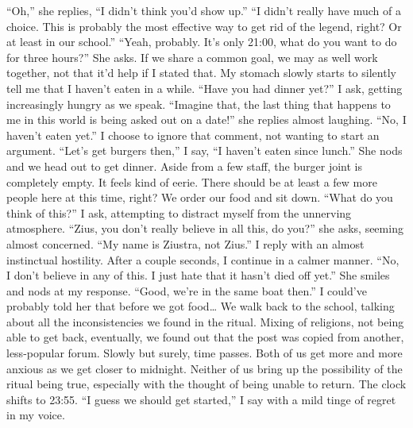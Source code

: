 \documentclass[a4paper, 12pt]{book}
\newcommand\tab[1][1cm]{\hspace*{#1}}
\begin{document}
\newline
\tab
“Oh,” she replies, “I didn’t think you’d show up.”
\newline
\tab
“I didn’t really have much of a choice. This is probably the most effective way to get rid of the legend, right? Or at least in our school.”
\newline
\tab
“Yeah, probably. It’s only 21:00, what do you want to do for three hours?” She asks. If we share a common goal, we may as well work together, not that it’d help if I stated that. My stomach slowly starts to silently tell me that I haven’t eaten in a while.
\newline
\tab
“Have you had dinner yet?” I ask, getting increasingly hungry as we speak.
\newline
\tab
“Imagine that, the last thing that happens to me in this world is being asked out on a date!” she replies almost laughing. “No, I haven’t eaten yet.” 
\newline
\tab
I choose to ignore that comment, not wanting to start an argument. “Let’s get burgers then,” I say, “I haven’t eaten since lunch.” She nods and we head out to get dinner. Aside from a few staff, the burger joint is completely empty. It feels kind of eerie. There should be at least a few more people here at this time, right? We order our food and sit down. “What do you think of this?” I ask, attempting to distract myself from the unnerving atmosphere.
\newline
\tab
“Zius, you don’t really believe in all this, do you?” she asks, seeming almost concerned.
\newline
\tab
“My name is Ziustra, not Zius.” I reply with an almost instinctual hostility. After a couple seconds, I continue in a calmer manner. “No, I don’t believe in any of this. I just hate that it hasn’t died off yet.”
\newline
\tab
She smiles and nods at my response. “Good, we’re in the same boat then.” I could’ve probably told her that before we got food…
\newline
\tab
We walk back to the school, talking about all the inconsistencies we found in the ritual. Mixing of religions, not being able to get back, eventually, we found out that the post was copied from another, less-popular forum. Slowly but surely, time passes. Both of us get more and more anxious as we get closer to midnight. Neither of us bring up the possibility of the ritual being true, especially with the thought of being unable to return. The clock shifts to 23:55. “I guess we should get started,” I say with a mild tinge of regret in my voice.
\end{document}
